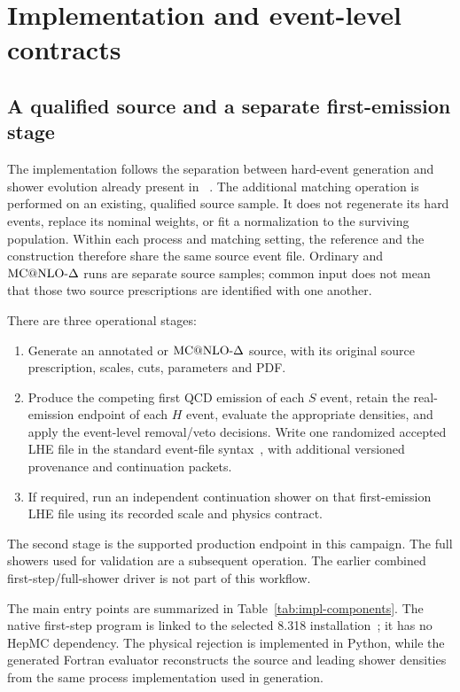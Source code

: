\section{Implementation and event-level contracts}
\label{sec:impl-workflow}

\subsection{A qualified source and a separate first-emission stage}
\label{sec:impl-stages}

The implementation follows the separation between hard-event generation and
shower evolution already present in \mg{}~\cite{Alwall}.  The additional
matching operation is performed on an existing, qualified source sample.
It does not regenerate its hard events, replace its nominal weights, or
fit a normalization to the surviving population.  Within each process
and matching setting, the \mcatnlo{} reference and the \macnlops{}
construction therefore share the same source event file.  Ordinary and
\(\text{MC@NLO-}\Delta\) runs are separate source samples; common input does not mean
that those two source prescriptions are identified with one another.

There are three operational stages:
\begin{enumerate}
\item Generate an annotated \mcatnlo{} or \(\text{MC@NLO-}\Delta\) source, with its
  original source prescription, scales, cuts, parameters and PDF.
\item Produce the competing first QCD emission of each \(S\) event,
  retain the real-emission endpoint of each \(H\) event, evaluate the
  appropriate densities, and apply the event-level removal/veto
  decisions.  Write one randomized accepted LHE file in the standard event-file syntax~\cite{LHEF}, with additional versioned provenance and continuation packets.
\item If required, run an independent continuation shower on that
  first-emission LHE file using its recorded scale and physics contract.
\end{enumerate}
The second stage is the supported production endpoint in this campaign.
The full showers used for validation are a subsequent operation.  The
earlier combined first-step/full-shower driver
 is not part of this workflow.

The main entry points are summarized in Table~\ref{tab:impl-components}.
The native first-step program is linked to the selected \pythia{} 8.318
installation~\cite{Pythia8}; it has no HepMC dependency.  The physical
rejection is implemented in Python, while the generated Fortran
evaluator reconstructs the source and leading shower densities from the
same process implementation used in generation.

